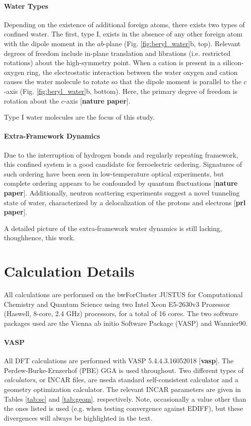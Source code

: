         \paragraph{Water Types} Depending on the existence of additional foreign atoms, there exists two types of confined water. The first, type I, exists in the absence of any other foreign atom with the dipole moment in the $ab$-plane (Fig. \ref{fig:beryl_water}b, top). Relevant degrees of freedom include in-plane translation and librations (i.e. restricted rotations) about the high-symmetry point. When a cation is present in a silicon-oxygen ring, the electrostatic interaction between the water oxygen and cation causes the water molecule to rotate so that the dipole moment is parallel to the $c$-axis (Fig. \ref{fig:beryl_water}b, bottom). Here, the primary degree of freedom is rotation about the $c$-axis [\textbf{nature paper}]. 
        
        Type I water molecules are the focus of this study.
        
        \paragraph{Extra-Framework Dynamics} Due to the interruption of hydrogen bonds and regularly repeating framework, this confined system is a good candidate for ferroelectric ordering. Signatures of such ordering have been seen in low-temperature optical experiments, but complete ordering appears to be confounded by quantum fluctuations [\textbf{nature paper}]. Additionally, neutron scattering experiments suggest a novel tunneling state of water, characterized by a delocalization of the protons and electrons [\textbf{prl paper}].
        
        A detailed picture of the extra-framework water dynamics is still lacking, though\textemdash hence, this work.
        
    \section{Calculation Details}
    
    All calculations are performed on the bwForCluster JUSTUS for Computational Chemistry and Quantum Science using two Intel Xeon E5-2630v3 Prozessor (Haswell, 8-core, 2.4 GHz) processors, for a total of 16 cores. The two software packages used are the Vienna ab initio Software Package (VASP) and Wannier90.
    
    \paragraph{VASP} All DFT calculations are performed with VASP 5.4.4.3.16052018 [\textbf{vasp}]. The Perdew-Burke-Ernzerhof (PBE) GGA is used throughout. Two different types of \textit{calculators}, or INCAR files, are used\textemdash a standard self-consistent calculator and a geometry optimization calculator. The relevant INCAR parameters are given in Tables \ref{tab:sc} and \ref{tab:geom}. respectively. Note, occasionally a value other than the ones listed is used (e.g. when testing convergence against EDIFF), but these divergences will always be highlighted in the text.
    

